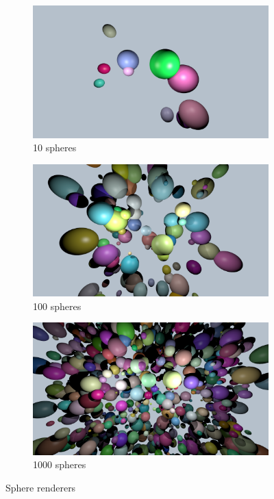 \documentclass{article}
\begin{document}
\begin{figure}[h]
	\centering
	\begin{subfigure}{0.3\textwidth}
		\includegraphics[width=\textwidth]{10_spheres}
		\caption{10 spheres}
		\label{fig:10spheres}
	\end{subfigure}%
	\hfill
	\begin{subfigure}{0.3\textwidth}
		\includegraphics[width=\textwidth]{100_spheres}
		\caption{100 spheres}
		\label{fig:100spheres}
	\end{subfigure}
	\hfill
	\begin{subfigure}{0.3\textwidth}
		\includegraphics[width=\textwidth]{1000_spheres}
		\caption{1000 spheres}
		\label{fig:1000spheres}
	\end{subfigure}
	
	\caption{Sphere renderers}
	\label{fig:spheres}
\end{figure}
\end{document}
